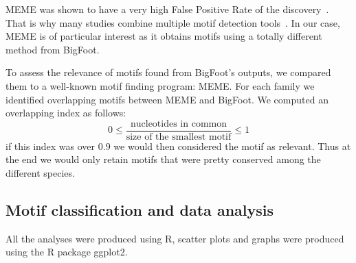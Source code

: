 MEME was shown to have a very high False Positive Rate of the discovery~\citep{zia_towards_2012}. That is why many studies combine multiple motif detection tools~\citep{liseron-monfils_promzea:_2013}. In our case, MEME is of particular interest as it obtains motifs using a totally different method from BigFoot.

To assess the relevance of motifs found from BigFoot's outputs, we compared them to a well-known motif finding program: MEME. For each family we identified overlapping motifs between MEME and BigFoot. We computed an overlapping index as follows: 
\begin{equation}
0 \leq \frac{\text{nucleotides in common}}{\text{size of the smallest motif}} \leq 1
\end{equation}
if this index was over $0.9$ we would then considered the motif as relevant. Thus at the end we would only retain motifs that were pretty conserved among the different species.

\subsection*{Motif classification and data analysis}

All the analyses were produced using R, scatter plots and graphs were produced using the R package ggplot2.

